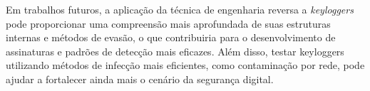 \documentclass[12pt]{article}
\begin{document}
Em trabalhos futuros, a aplicação da técnica de engenharia reversa a \textit{keyloggers} pode 
proporcionar uma compreensão mais aprofundada de suas estruturas internas e métodos de evasão, 
o que contribuiria para o desenvolvimento de assinaturas e padrões de detecção mais eficazes. Além disso, 
testar keyloggers utilizando métodos de infecção mais eficientes, 
como contaminação por rede, pode ajudar a fortalecer ainda mais o cenário da segurança digital.




\end{document}
